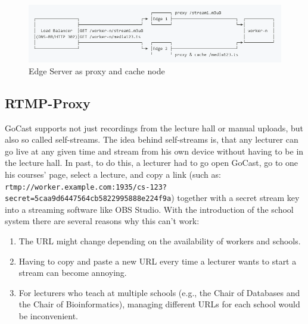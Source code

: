 \begin{figure}[htpb]
    \centering
    \includegraphics[width=\linewidth]{images/EdgeNetwork.png}
    \caption[Edge Server as proxy and cache node]{Edge Server as proxy and cache node}\label{fig:edge-network}
\end{figure}


\subsection{RTMP-Proxy}

GoCast supports not just recordings from the lecture hall or manual uploads, but also so called self-streams. The idea behind self-streams is, that any lecturer can go live at any given time and stream from his own device without having to be in the lecture hall. In past, to do this, a lecturer had to go open GoCast, go to one his courses' page, select a lecture, and copy a link (such as: \texttt{rtmp://worker.example.com:1935/cs-123? secret=5caa9d6447564cb5822995888e224f9a}) together with a secret stream key into a streaming software like OBS Studio. With the introduction of the school system there are several reasons why this can't work:

\begin{enumerate}
    \item The URL might change depending on the availability of workers and schools.
    \item Having to copy and paste a new URL every time a lecturer wants to start a stream can become annoying.
    \item For lecturers who teach at multiple schools (e.g., the Chair of Databases and the Chair of Bioinformatics), managing different URLs for each school would be inconvenient.
\end{enumerate}


